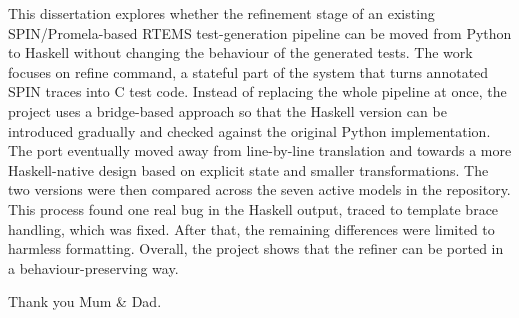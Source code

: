 \documentclass[a4paper, 12pt, oneside]{report}         %
\begin{document}

\thesistitlepage                                  %



\begin{thesisabstract}                            %
This dissertation explores whether the refinement stage of an existing SPIN/Promela-based RTEMS test-generation pipeline can be moved from Python to Haskell without changing the behaviour of the generated tests. The work focuses on refine command, a stateful part of the system that turns annotated SPIN traces into C test code. Instead of replacing the whole pipeline at once, the project uses a bridge-based approach so that the Haskell version can be introduced gradually and checked against the original Python implementation. The port eventually moved away from line-by-line translation and towards a more Haskell-native design based on explicit state and smaller transformations. The two versions were then compared across the seven active models in the repository. This process found one real bug in the Haskell output, traced to template brace handling, which was fixed. After that, the remaining differences were limited to harmless formatting. Overall, the project shows that the refiner can be ported in a behaviour-preserving way.
\end{thesisabstract}


\begin{thesisacknowledgments}                     %
  Thank you Mum \& Dad.                           %
\end{thesisacknowledgments}                       %
  
  
\tableofcontents                                  %
\listoftables                                     %
\listoffigures                                    %
\end{document}
